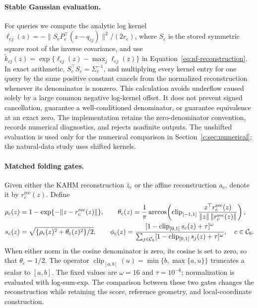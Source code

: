 \paragraph{Stable Gaussian evaluation.}
For queries we compute the analytic log kernel
$\ell_{cj}(z)=-\|S_cP_c^\top(z-q_{cj})\|^2/(2r_c)$, where $S_c$ is the
stored symmetric square root of the inverse covariance, and use
$\widetilde k_{cj}(z)=\exp\{\ell_{cj}(z)-\max_j\ell_{cj}(z)\}$ in
Equation~\eqref{eq:nf-reconstruction}.
In exact arithmetic, $S_c^\top S_c=\Sigma_c^{-1}$, and multiplying every
kernel entry for one query by the same positive constant cancels from the
normalized reconstruction whenever its denominator is nonzero.
This calculation avoids underflow caused solely by a large common negative
log-kernel offset.  It does not prevent signed cancellation, guarantee a
well-conditioned denominator, or guarantee equivalence at an exact zero.
The implementation retains the zero-denominator convention, records numerical
diagnostics, and rejects nonfinite outputs.  The unshifted evaluation is used only for the numerical comparison in
Section~\ref{c:sec:numerical}; the natural-data study uses shifted kernels.

\paragraph{Matched folding gates.}
Given either the KAHM reconstruction $\widehat z_c$ or the affine
reconstruction $a_c$, denote it by $r_c^{\mathrm{rec}}(z)$.  Define
\begin{align}
 \rho_c(z)&=1-\exp\{-\|z-r_c^{\mathrm{rec}}(z)\|\},\qquad
 \theta_c(z)=\frac1\pi\arccos\!\left(
 \operatorname{clip}_{[-1,1]}
 \frac{z^\top r_c^{\mathrm{rec}}(z)}{\|z\|\,\|r_c^{\mathrm{rec}}(z)\|}\right),
 \notag\\
 s_c(z)&=\sqrt{\{\rho_c(z)^2+\theta_c(z)^2\}/2},\qquad
 \phi_c(z)=\frac{[1-\operatorname{clip}_{[0,1]}s_c(z)+\tau]^\omega}
 {\sum_{j\in\mathcal C_b}[1-\operatorname{clip}_{[0,1]}s_j(z)+\tau]^\omega},
 \quad c\in\mathcal C_b.
 \label{eq:nf-folding-gates}
\end{align}
When either norm in the cosine denominator is zero, its cosine is set to
zero, so that $\theta_c=1/2$.  The operator $\operatorname{clip}_{[a,b]}(u)=\min\{b,\max\{a,u\}\}$
truncates a scalar to $[a,b]$. The fixed values are $\omega=16$ and
$\tau=10^{-6}$; normalization is evaluated with log-sum-exp.  The comparison
between these two gates changes the reconstruction while retaining the
score, reference geometry, and local-coordinate construction.

